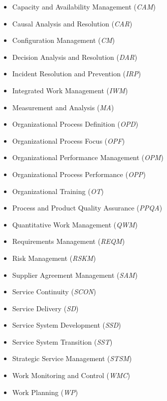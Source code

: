 \begin{itemize}
\begin{itemize}
	\item Capacity and Availability Management (\textit{CAM})
	\item Causal Analysis and Resolution (\textit{CAR})
	\item Configuration Management (\textit{CM})
	\item Decision Analysis and Resolution (\textit{DAR})
	\item Incident Resolution and Prevention (\textit{IRP})
	\item Integrated Work Management (\textit{IWM})
	\item Measurement and Analysis (\textit{MA})
	\item Organizational Process Definition (\textit{OPD})
	\item Organizational Process Focus (\textit{OPF})
	\item Organizational Performance Management (\textit{OPM})
	\item Organizational Process Performance (\textit{OPP})
	\item Organizational Training (\textit{OT})
	\item Process and Product Quality Assurance (\textit{PPQA})
	\item Quantitative Work Management (\textit{QWM})
	\item Requirements Management (\textit{REQM})
	\item Risk Management (\textit{RSKM})
	\item Supplier Agreement Management (\textit{SAM})
	\item Service Continuity (\textit{SCON})
	\item Service Delivery (\textit{SD})
	\item Service System Development (\textit{SSD})
	\item Service System Transition (\textit{SST})
	\item Strategic Service Management (\textit{STSM})
	\item Work Monitoring and Control (\textit{WMC})
	\item Work Planning (\textit{WP})
\end{itemize}

		 
\end{itemize}